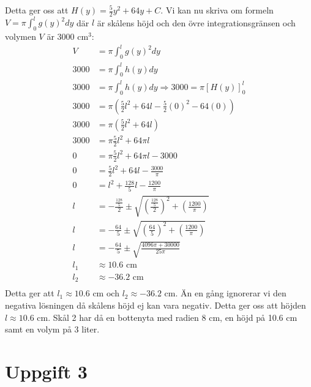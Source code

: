 \documentclass[12pt]{article}
\begin{document}
Detta ger oss att $H(y)=\frac{5}{2}y^2+64y+C$.
\newpage
Vi kan nu skriva om formeln $V=\pi\int_{0}^{l}{g(y)}^2dy$ där $l$ är skålens höjd och den övre integrationsgränsen och volymen $V$ är $3000$ cm$^3$:
\begin{align*}
    V&=\pi\int_{0}^{l}{g(y)}^2dy\\
    3000&=\pi\int_{0}^{l}{h(y)}dy\\
    3000&=\pi\int_{0}^{l}{h(y)}dy\Rightarrow 3000=\pi{\left[{H(y)}\right]}_{0}^{l}\\
    3000&=\pi\left(\frac{5}{2}{l}^2+64l-\frac{5}{2}{(0)}^2-64(0)\right)\\
    3000&=\pi\left(\frac{5}{2}{l}^2+64l\right)\\
    3000&=\pi\frac{5}{2}l^2+64\pi l\\
    0&=\pi\frac{5}{2}l^2+64\pi l-3000\\
    0&=\frac{5}{2}l^2+64l-\frac{3000}{\pi}\\
    0&=l^2+\frac{128}{5}l-\frac{1200}{\pi}\\
    l&=-\frac{\frac{128}{5}}{2}\pm\sqrt{{\left(\frac{\frac{128}{5}}{2}\right)}^2+\left(\frac{1200}{\pi}\right)}\\
    l&=-\frac{64}{5}\pm\sqrt{{\left(\frac{64}{5}\right)}^2+\left(\frac{1200}{\pi}\right)}\\
    l&=-\frac{64}{5}\pm\sqrt{\frac{4096\pi+30000}{25\pi}}\\
    l_1&\approx 10.6\text{ cm}\\
    l_2&\approx -36.2\text{ cm}\\
\end{align*}
Detta ger att $l_1\approx 10.6\text{ cm}$ och $l_2\approx -36.2\text{ cm}$. Än en gång ignorerar vi den negativa lösningen då skålens höjd ej kan vara negativ. Detta ger oss att höjden $l\approx 10.6\text{ cm}$. Skål 2 har då en bottenyta med radien 8 cm, en höjd på 10.6 cm samt en volym på 3 liter.
\newpage
\section*{Uppgift 3}
\end{document}
